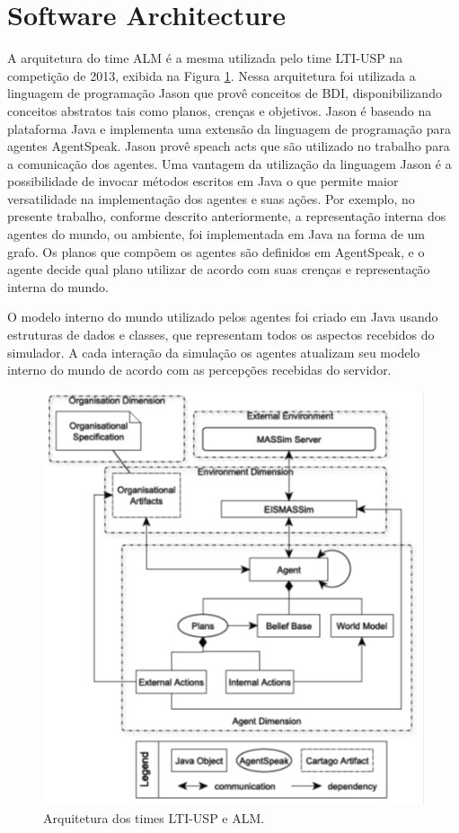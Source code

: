 \documentclass{llncs}
\begin{document}
\section{Software Architecture}

A arquitetura do time ALM é a mesma utilizada pelo time LTI-USP na competição de 2013, exibida na Figura \ref{fig:fig1}. Nessa arquitetura foi utilizada a linguagem de programação Jason que provê conceitos de BDI, disponibilizando conceitos abstratos tais como planos, crenças e objetivos. Jason é baseado na plataforma Java e implementa uma extensão da linguagem de programação para agentes AgentSpeak. Jason provê speach acts que são utilizado no trabalho para a comunicação dos agentes. Uma vantagem da utilização da linguagem Jason é a possibilidade de invocar métodos escritos em Java o que permite maior versatilidade na implementação dos agentes e suas ações. Por exemplo, no presente trabalho, conforme descrito anteriormente, a representação interna dos agentes do mundo, ou ambiente, foi implementada em Java na forma de um grafo. Os planos que compõem os agentes são definidos em AgentSpeak, e o agente decide qual plano utilizar de acordo com suas crenças e representação interna do mundo.

O modelo interno do mundo utilizado pelos agentes foi criado em Java usando estruturas de dados e classes, que representam todos os aspectos recebidos do simulador. A cada interação da simulação os agentes atualizam seu modelo interno do mundo de acordo com as percepções recebidas do servidor.


\begin{figure}[!ht]
\centering
\includegraphics[width=0.7\linewidth]{./images/fig1.png}
\caption{Arquitetura dos times LTI-USP e ALM.}
\label{fig:fig1}
\end{figure}
\end{document}
